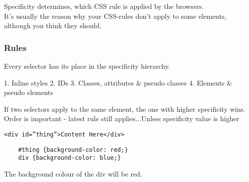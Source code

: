 Specificity determines, which CSS rule is applied by the browsers.
\\

It’s usually the reason why your CSS-rules don’t apply to some elements, although you think they should.

\subsubsection{Rules}

Every selector has its place in the specificity hierarchy.

1. Inline styles
2. IDs
3. Classes, attributes & pseudo classes
4. Elements & pseudo elements

If two selectors apply to the same element, the one with higher specificity wins.
\\

Order is important - latest rule still applies...Unless specificity value is higher

\begin{verbatim}
<div id=”thing”>Content Here</div>
\end{verbatim}

\begin{verbatim}
    #thing {background-color: red;}
    div {background-color: blue;}
\end{verbatim}

The background colour of the div will be red.


